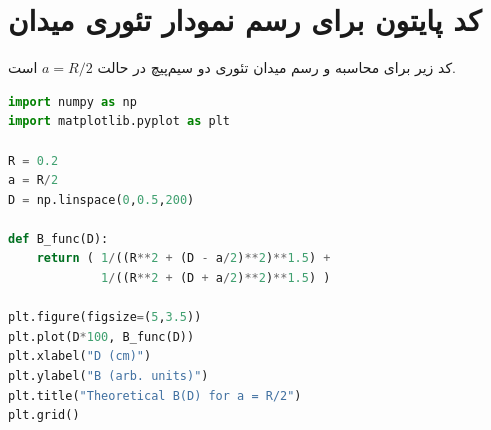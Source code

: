 \documentclass[a4paper, 11pt]{article}
\begin{document}
\newpage


\appendix
\section{ کد پایتون برای رسم نمودار تئوری میدان}

کد زیر برای محاسبه و رسم میدان تئوری دو سیم‌پیچ در حالت 
$a = R/2$
است.
\begin{latin}

\begin{lstlisting}[language=Python]
import numpy as np
import matplotlib.pyplot as plt

R = 0.2
a = R/2
D = np.linspace(0,0.5,200)

def B_func(D):
    return ( 1/((R**2 + (D - a/2)**2)**1.5) +
             1/((R**2 + (D + a/2)**2)**1.5) )

plt.figure(figsize=(5,3.5))
plt.plot(D*100, B_func(D))
plt.xlabel("D (cm)")
plt.ylabel("B (arb. units)")
plt.title("Theoretical B(D) for a = R/2")
plt.grid()
\end{lstlisting}
\end{latin}



\end{document}
